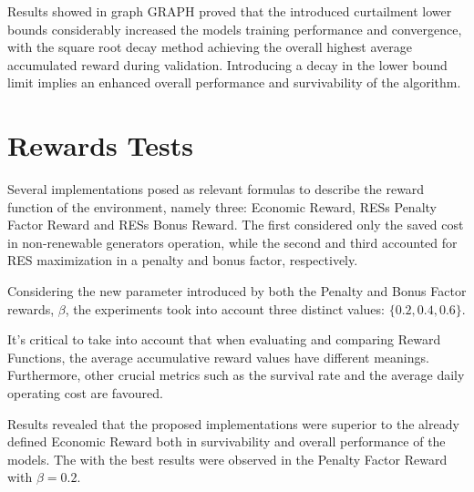 \begin{comment}
	Graph:
	- No limit
	- Fixed Limit
	- Linear Limit
	- Sqrt Limit
\end{comment}

\begin{comment}
	Validation Table
	Graph:
	- No limit
	- Fixed Limit
	- Linear Limit
	- Sqrt Limit
\end{comment}

Results showed in graph GRAPH proved that the introduced curtailment lower bounds considerably increased the models training performance and convergence, with the square root decay method achieving the overall highest average accumulated reward during validation. Introducing a decay in the lower bound limit implies an enhanced overall performance and survivability of the algorithm.

\section{Rewards Tests} \label{sec:rewards}

Several implementations posed as relevant formulas to describe the reward function of the environment, namely three: Economic Reward, \acp{RES} Penalty Factor Reward and \acp{RES} Bonus Reward. The first considered only the saved cost in non-renewable generators operation, while the second and third accounted for \ac{RES} maximization in a penalty and bonus factor, respectively.
\par

Considering the new parameter introduced by both the Penalty and Bonus Factor rewards, $\beta$, the experiments took into account three distinct values: $\{0.2, 0.4, 0.6\}$.


\par
\begin{comment}
	Graph:
	- Economic Reward
	- Penalty Reward
	- Bonus Reward
	
	Graph:
	- 0.2 pen
	- 0.4 pen
	- 0.6 pen
	- 0.2 bonus
	- 0.4 bonus
	- 0.6 bonus
	
	Do result discussion:
	- Penalty with 0.4 factor was the best
\end{comment}

It's critical to take into account that when evaluating and comparing Reward Functions, the average accumulative reward values have different meanings. Furthermore, other crucial metrics such as the survival rate and the average daily operating cost are favoured.
\par
Results revealed that the proposed implementations were superior to the already defined Economic Reward both in survivability and overall performance of the models. The with the best results were observed in the Penalty Factor Reward with $\beta = 0.2$.

